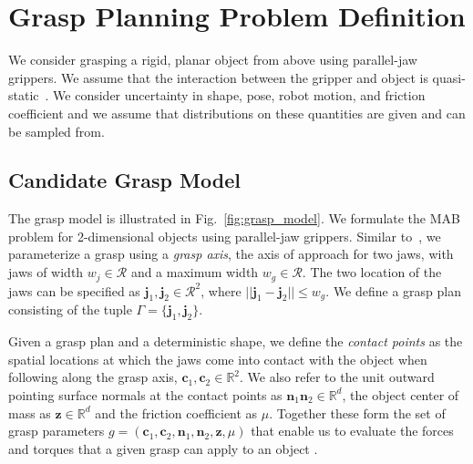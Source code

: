 \documentclass[a4paper, 10pt, conference]{ieeeconf}      %
\newcommand{\bc}{\mathbf{c}}
\newcommand{\bn}{\mathbf{n}}
\newcommand{\bz}{\mathbf{z}}
\begin{document}
\section{Grasp Planning Problem Definition}
We consider grasping a rigid, planar object from above using parallel-jaw grippers.
We assume that the interaction between the gripper and object is quasi-static~\cite{kehoe2012estimating, kehoe2012toward}.
We consider uncertainty in shape, pose, robot motion, and friction coefficient and we assume that distributions on these quantities are given and can be sampled from. 



\subsection{Candidate Grasp Model}
The grasp model is illustrated in Fig.~\ref{fig:grasp_model}. We formulate the MAB problem for 2-dimensional objects using parallel-jaw grippers. Similar to~\cite{mahler2015gp}, we parameterize a grasp using a {\it grasp axis}, the axis of approach for two jaws,  with jaws of width $w_j \in \mathcal{R}$ and a maximum width $w_g \in \mathcal{R}$. The two location of the jaws can be specified as $\mathbf{j}_1,\mathbf{j}_2 \in \mathcal{R}^2$, where $||\mathbf{j}_1 - \mathbf{j}_2|| \leq w_g$. We define a grasp plan consisting of the tuple $\Gamma = \lbrace \mathbf{j}_1, \mathbf{j}_2 \rbrace$. 

Given a grasp plan and a deterministic shape, we define the {\it contact points} as the spatial locations at which the jaws come into contact with the object when following along the grasp axis, $\bc_1, \bc_2 \in \mathbb{R}^2$.
We also refer to the unit outward pointing surface normals at the contact points as $\bn_1 \bn_2 \in \mathbb{R}^d$, the object center of mass as $\bz \in \mathbb{R}^d$ and the friction coefficient as $\mu$.
Together these form the set of grasp parameters $g = (\bc_1,\bc_2, \bn_1, \bn_2, \bz,\mu)$ that enable us to evaluate the forces and torques that a given grasp can apply to an object \cite{ferrari1992}. 
\end{document}
